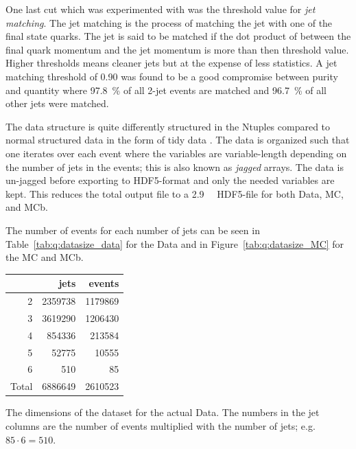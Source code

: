 One last cut which was experimented with was the threshold value for \emph{jet matching}. The jet matching is the process of matching the jet with one of the final state quarks. The jet is said to be matched if the dot product of between the final quark momentum and the jet momentum is more than then threshold value. Higher thresholds means cleaner jets but at the expense of less statistics. A jet matching threshold of \num{0.90} was found to be a good compromise between purity and quantity where \SI{97.8}{\percent} of all 2-jet events are matched and \SI{96.7}{\percent} of all other jets were matched.  

The data structure is quite differently structured in the Ntuples compared to normal structured data in the form of tidy data \autocite{JSSv059i10}. The data is organized such that one iterates over each event where the variables are variable-length depending on the number of jets in the events; this is also known as \emph{jagged} arrays. The data is un-jagged before exporting to HDF5-format and only the needed variables are kept. This reduces the total output file to a \SI{2.9}{\giga\byte} HDF5-file for both Data, MC, and MCb.

The number of events for each number of jets can be seen in Table~\ref{tab:q:datasize_data} for the Data and in Figure~\ref{tab:q:datasize_MC} for the MC and MCb. 

\begin{margintable}
  \centering
  \begin{tabular}{@{}rrr@{}}
  {} &       jets &     events \\
  \midrule
  \num{2}     &  \num{2359738} &  \num{1179869} \\
  \num{3}     &  \num{3619290} &  \num{1206430} \\
  \num{4}     &   \num{854336} &   \num{213584} \\
  \num{5}     &    \num{52775} &    \num{10555} \\
  \num{6}     &      \num{510} &       \num{85} \\
  Total       &  \num{6886649} &  \num{2610523} \\  
  \end{tabular}
  \vspace{\abovecaptionskip}
  \caption[Dimensions of dataset for Data]{The dimensions of the dataset for the actual Data. The numbers in the jet columns are the number of events multiplied with the number of jets; e.g. $85 \cdot 6 = 510$.}
  \label{tab:q:datasize_data}
\end{margintable}

